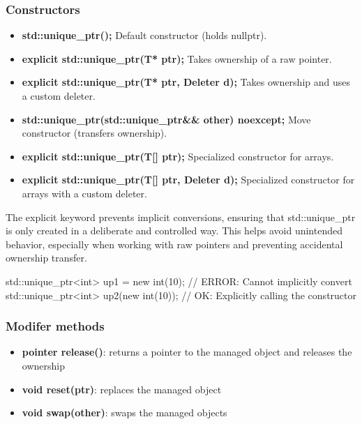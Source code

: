 \documentclass{report}
\begin{document}
        \subsubsection{Constructors}
        \bigbreak \noindent 
        \begin{itemize}
            \item \textbf{std::unique\_ptr();}	Default constructor (holds nullptr).
            \item \textbf{explicit std::unique\_ptr(T* ptr);}	Takes ownership of a raw pointer.
            \item \textbf{explicit std::unique\_ptr(T* ptr, Deleter d);}	Takes ownership and uses a custom deleter.
            \item \textbf{std::unique\_ptr(std::unique\_ptr\&\& other) noexcept;}	Move constructor (transfers ownership).
            \item \textbf{explicit std::unique\_ptr(T[] ptr);}	Specialized constructor for arrays.
            \item \textbf{explicit std::unique\_ptr(T[] ptr, Deleter d);}	Specialized constructor for arrays with a custom deleter.
        \end{itemize}
        \bigbreak \noindent 
        The explicit keyword prevents implicit conversions, ensuring that std::unique\_ptr is only created in a deliberate and controlled way. This helps avoid unintended behavior, especially when working with raw pointers and preventing accidental ownership transfer.
        \bigbreak \noindent 
        \begin{cppcode}
        std::unique_ptr<int> up1 = new int(10);  // ERROR: Cannot implicitly convert
        std::unique_ptr<int> up2(new int(10));   // OK: Explicitly calling the constructor
        \end{cppcode}
        \bigbreak \noindent 
        \subsubsection{Modifer methods}
        \bigbreak \noindent 
        \begin{itemize}
            \item \textbf{pointer release()}: returns a pointer to the managed object and releases the ownership
            \item \textbf{void reset(ptr)}: replaces the managed object
            \item \textbf{void swap(other)}: swaps the managed objects
        \end{itemize}
\end{document}
